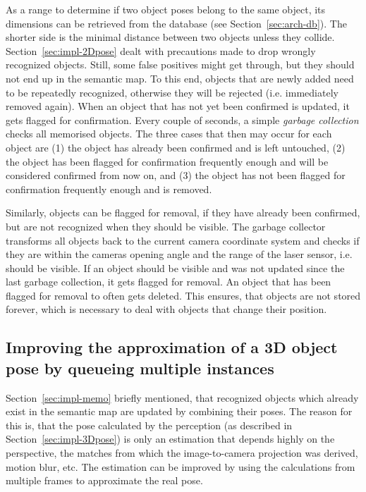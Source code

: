 As a range to determine if two object poses belong to the same object, its dimensions can be retrieved from the database (see Section~\ref{sec:arch-db}). The shorter side is the minimal distance between two objects unless they collide. \\

Section~\ref{sec:impl-2Dpose} dealt with precautions made to drop wrongly recognized objects. Still, some false positives might get through, but they should not end up in the semantic map. To this end, objects that are newly added need to be repeatedly recognized, otherwise they will be rejected (i.e. immediately removed again). When an object that has not yet been confirmed is updated, it gets flagged for confirmation. Every couple of seconds, a simple \textit{garbage collection} checks all memorised objects. The three cases that then may occur for each object are (1) the object has already been confirmed and is left untouched, (2) the object has been flagged for confirmation frequently enough and will be considered confirmed from now on, and (3) the object has not been flagged for confirmation frequently enough and is removed.

Similarly, objects can be flagged for removal, if they have already been confirmed, but are not recognized when they should be visible. The garbage collector transforms all objects back to the current camera coordinate system and checks if they are within the cameras opening angle and the range of the laser sensor, i.e. should be visible. If an object should be visible and was not updated since the last garbage collection, it gets flagged for removal. An object that has been flagged for removal to often gets deleted. This ensures, that objects are not stored forever, which is necessary to deal with objects that change their position.

\subsection{Improving the approximation of a 3D object pose by queueing multiple instances}
\label{sec:impl-queue}
Section~\ref{sec:impl-memo} briefly mentioned, that recognized objects which already exist in the semantic map are updated by combining their poses. The reason for this is, that the pose calculated by the perception (as described in Section~\ref{sec:impl-3Dpose}) is only an estimation that depends highly on the perspective, the matches from which the image-to-camera projection was derived, motion blur, etc. The estimation can be improved by using the calculations from multiple frames to approximate the real pose. \\


